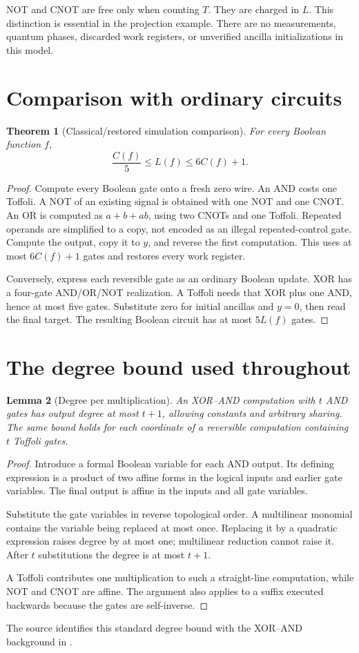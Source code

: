 \documentclass[11pt,letterpaper,oneside]{report}
\theoremstyle{komorebi}
\newtheorem{theorem}{Theorem}[chapter]
\newtheorem{lemma}[theorem]{Lemma}
\begin{document}
NOT and CNOT are free only when counting $T$. They are charged in $L$. This distinction is essential in the projection example. There are no measurements, quantum phases, discarded work registers, or unverified ancilla initializations in this model.

\section{Comparison with ordinary circuits}
\begin{theorem}[Classical/restored simulation comparison]\label{thm:simulation}
For every Boolean function $f$,
\[
\frac{C(f)}5\le L(f)\le6C(f)+1.
\]
\end{theorem}
\begin{proof}
Compute every Boolean gate onto a fresh zero wire. An AND costs one Toffoli. A NOT of an existing signal is obtained with one NOT and one CNOT. An OR is computed as $a+b+ab$, using two CNOTs and one Toffoli. Repeated operands are simplified to a copy, not encoded as an illegal repeated-control gate. Compute the output, copy it to $y$, and reverse the first computation. This uses at most $6C(f)+1$ gates and restores every work register.

Conversely, express each reversible gate as an ordinary Boolean update. XOR has a four-gate AND/OR/NOT realization. A Toffoli needs that XOR plus one AND, hence at most five gates. Substitute zero for initial ancillas and $y=0$, then read the final target. The resulting Boolean circuit has at most $5L(f)$ gates.
\end{proof}

\section{The degree bound used throughout}
\begin{lemma}[Degree per multiplication]\label{lem:degree}
An XOR--AND computation with $t$ AND gates has output degree at most $t+1$, allowing constants and arbitrary sharing. The same bound holds for each coordinate of a reversible computation containing $t$ Toffoli gates.
\end{lemma}
\begin{proof}
Introduce a formal Boolean variable for each AND output. Its defining expression is a product of two affine forms in the logical inputs and earlier gate variables. The final output is affine in the inputs and all gate variables.

Substitute the gate variables in reverse topological order. A multilinear monomial contains the variable being replaced at most once. Replacing it by a quadratic expression raises degree by at most one; multilinear reduction cannot raise it. After $t$ substitutions the degree is at most $t+1$.

A Toffoli contributes one multiplication to such a straight-line computation, while NOT and CNOT are affine. The argument also applies to a suffix executed backwards because the gates are self-inverse.
\end{proof}
The source identifies this standard degree bound with the XOR--AND background in \cite{soeken}.
\end{document}

